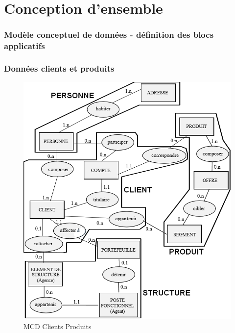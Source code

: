 \part{Conception d'ensemble}
\setcounter{section}{0}

\section{Modèle conceptuel de données - définition des blocs applicatifs} 

\section{Données clients et produits} 


\begin{figure}[h]
\centering
\includegraphics[width=\textwidth]{figures/mcd/MCD_Clients_Produits}
\caption{MCD Clients Produits}
\end{figure}


